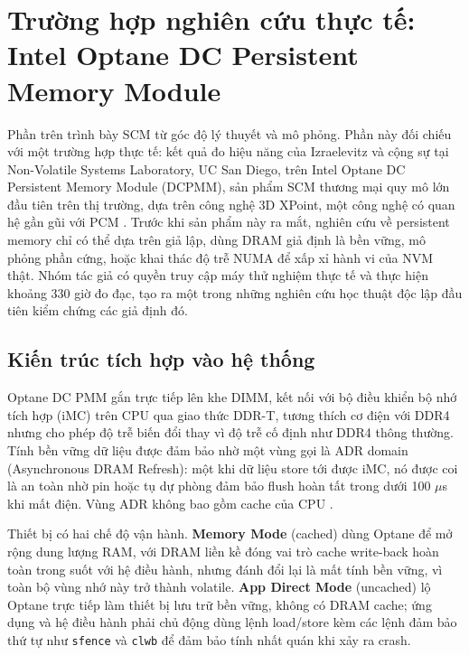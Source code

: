 \documentclass[12pt,a4paper]{article}
\begin{document}
\section{Trường hợp nghiên cứu thực tế: Intel Optane DC Persistent Memory Module}
\label{sec:optane}

Phần trên trình bày SCM từ góc độ lý thuyết và mô phỏng. Phần này đối chiếu với một trường hợp thực tế: kết quả đo hiệu năng của Izraelevitz và cộng sự tại Non-Volatile Systems Laboratory, UC San Diego, trên Intel Optane DC Persistent Memory Module (DCPMM), sản phẩm SCM thương mại quy mô lớn đầu tiên trên thị trường, dựa trên công nghệ 3D XPoint, một công nghệ có quan hệ gần gũi với PCM \cite{izraelevitz2019}. Trước khi sản phẩm này ra mắt, nghiên cứu về persistent memory chỉ có thể dựa trên giả lập, dùng DRAM giả định là bền vững, mô phỏng phần cứng, hoặc khai thác độ trễ NUMA để xấp xỉ hành vi của NVM thật. Nhóm tác giả có quyền truy cập máy thử nghiệm thực tế và thực hiện khoảng 330 giờ đo đạc, tạo ra một trong những nghiên cứu học thuật độc lập đầu tiên kiểm chứng các giả định đó.

\subsection{Kiến trúc tích hợp vào hệ thống}

Optane DC PMM gắn trực tiếp lên khe DIMM, kết nối với bộ điều khiển bộ nhớ tích hợp (iMC) trên CPU qua giao thức DDR-T, tương thích cơ điện với DDR4 nhưng cho phép độ trễ biến đổi thay vì độ trễ cố định như DDR4 thông thường. Tính bền vững dữ liệu được đảm bảo nhờ một vùng gọi là ADR domain (Asynchronous DRAM Refresh): một khi dữ liệu store tới được iMC, nó được coi là an toàn nhờ pin hoặc tụ dự phòng đảm bảo flush hoàn tất trong dưới 100 $\mu$s khi mất điện. Vùng ADR không bao gồm cache của CPU \cite{izraelevitz2019}.

Thiết bị có hai chế độ vận hành. \textbf{Memory Mode} (cached) dùng Optane để mở rộng dung lượng RAM, với DRAM liền kề đóng vai trò cache write-back hoàn toàn trong suốt với hệ điều hành, nhưng đánh đổi lại là mất tính bền vững, vì toàn bộ vùng nhớ này trở thành volatile. \textbf{App Direct Mode} (uncached) lộ Optane trực tiếp làm thiết bị lưu trữ bền vững, không có DRAM cache; ứng dụng và hệ điều hành phải chủ động dùng lệnh load/store kèm các lệnh đảm bảo thứ tự như \texttt{sfence} và \texttt{clwb} để đảm bảo tính nhất quán khi xảy ra crash.
\end{document}
